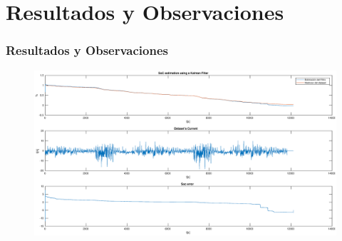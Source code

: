 \documentclass[10pt]{beamer}
\theoremstyle{remark}
\theoremstyle{definition}
\begin{document}
\section{Resultados y Observaciones}
\begin{frame}[allowframebreaks]
  \frametitle{Resultados y Observaciones}

  \begin{figure}[h!]
	\includegraphics[width=1\textwidth]{images/kf_result_25degree.eps}
  \end{figure}

\end{frame}
\end{document}
